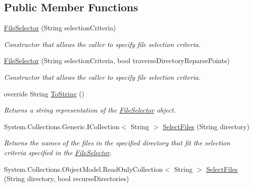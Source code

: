 \subsection*{Public Member Functions}
\begin{DoxyCompactItemize}
\item 
\mbox{\hyperlink{class_super_tiled2_unity_1_1_ionic_1_1_file_selector_af4eb6aa0e0d86c9af92a0dbea18ec673}{File\+Selector}} (String selection\+Criteria)
\begin{DoxyCompactList}\small\item\em Constructor that allows the caller to specify file selection criteria. \end{DoxyCompactList}\item 
\mbox{\hyperlink{class_super_tiled2_unity_1_1_ionic_1_1_file_selector_a3c48fb07f40c9390505395257fee90cf}{File\+Selector}} (String selection\+Criteria, bool traverse\+Directory\+Reparse\+Points)
\begin{DoxyCompactList}\small\item\em Constructor that allows the caller to specify file selection criteria. \end{DoxyCompactList}\item 
override String \mbox{\hyperlink{class_super_tiled2_unity_1_1_ionic_1_1_file_selector_a8fa535a32889af944e74d9621c93edf1}{To\+String}} ()
\begin{DoxyCompactList}\small\item\em Returns a string representation of the \mbox{\hyperlink{class_super_tiled2_unity_1_1_ionic_1_1_file_selector}{File\+Selector}} object. \end{DoxyCompactList}\item 
System.\+Collections.\+Generic.\+I\+Collection$<$ String $>$ \mbox{\hyperlink{class_super_tiled2_unity_1_1_ionic_1_1_file_selector_a378ddfe137426330784a2561be3a5899}{Select\+Files}} (String directory)
\begin{DoxyCompactList}\small\item\em Returns the names of the files in the specified directory that fit the selection criteria specified in the \mbox{\hyperlink{class_super_tiled2_unity_1_1_ionic_1_1_file_selector}{File\+Selector}}. \end{DoxyCompactList}\item 
System.\+Collections.\+Object\+Model.\+Read\+Only\+Collection$<$ String $>$ \mbox{\hyperlink{class_super_tiled2_unity_1_1_ionic_1_1_file_selector_a7678841863d20889f7b0be2737550be3}{Select\+Files}} (String directory, bool recurse\+Directories)

\end{DoxyCompactItemize}
